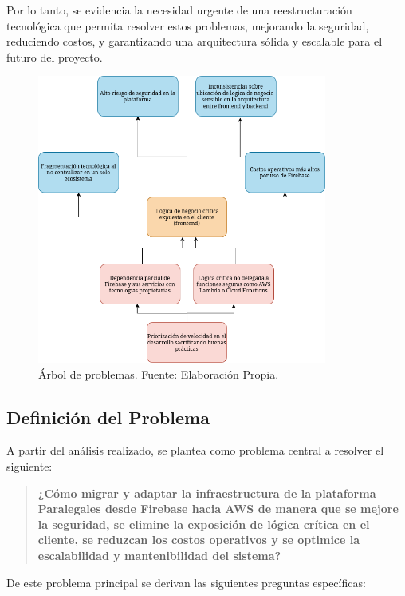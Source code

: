 Por lo tanto, se evidencia la necesidad urgente de una reestructuración tecnológica que permita resolver estos problemas, mejorando la seguridad, reduciendo costos, y garantizando una arquitectura sólida y escalable para el futuro del proyecto.

\begin{figure}[H]
  \centering
  \includegraphics[width=0.85\textwidth]{img/figures/fig2-arbol-de-problemas.png}
  \caption{Árbol de problemas. Fuente: Elaboración Propia.}
  \label{fig:arbol_problemas}
\end{figure}

\subsection{Definición del Problema}
A partir del análisis realizado, se plantea como problema central a resolver el siguiente:
\begin{quote}
  \textbf{¿Cómo migrar y adaptar la infraestructura de la plataforma Paralegales desde Firebase hacia AWS de manera que se mejore la seguridad, se elimine la exposición de lógica crítica en el cliente, se reduzcan los costos operativos y se optimice la escalabilidad y mantenibilidad del sistema?}
\end{quote}

De este problema principal se derivan las siguientes preguntas específicas:

